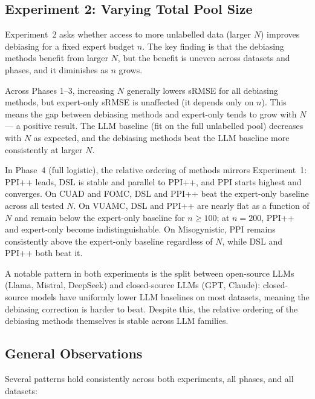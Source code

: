\subsection{Experiment 2: Varying Total Pool Size}
\label{sec:exp2}

Experiment~2 asks whether access to more unlabelled data (larger $N$) improves debiasing for a fixed expert budget $n$. The key finding is that the debiasing methods benefit from larger $N$, but the benefit is uneven across datasets and phases, and it diminishes as $n$ grows.

Across Phases 1–3, increasing $N$ generally lowers sRMSE for all debiasing methods, but expert-only sRMSE is unaffected (it depends only on $n$). This means the gap between debiasing methods and expert-only tends to grow with $N$ — a positive result. The LLM baseline (fit on the full unlabelled pool) decreases with $N$ as expected, and the debiasing methods beat the LLM baseline more consistently at larger $N$.

In Phase~4 (full logistic), the relative ordering of methods mirrors Experiment~1: PPI++ leads, DSL is stable and parallel to PPI++, and PPI starts highest and converges. On CUAD and FOMC, DSL and PPI++ beat the expert-only baseline across all tested $N$. On VUAMC, DSL and PPI++ are nearly flat as a function of $N$ and remain below the expert-only baseline for $n \geq 100$; at $n = 200$, PPI++ and expert-only become indistinguishable. On Misogynistic, PPI remains consistently above the expert-only baseline regardless of $N$, while DSL and PPI++ both beat it.

A notable pattern in both experiments is the split between open-source LLMs (Llama, Mistral, DeepSeek) and closed-source LLMs (GPT, Claude): closed-source models have uniformly lower LLM baselines on most datasets, meaning the debiasing correction is harder to beat. Despite this, the relative ordering of the debiasing methods themselves is stable across LLM families.

\subsection{General Observations}
\label{sec:general-obs}

Several patterns hold consistently across both experiments, all phases, and all datasets:

